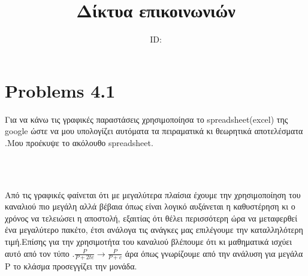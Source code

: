 \documentclass{article}
\title{Δίκτυα επικοινωνιών \\ \exerciseset}
\author{\studentname \qquad  ID: \suid}
\begin{document}
\maketitle
\section*{Problems 4.1}
Για να κάνω τις γραφικές παραστάσεις χρησιμοποίησα το spreadsheet(excel) της google ώστε να μου υπολογίζει αυτόματα τα πειραματικά κι θεωρητικά αποτελέσματα .Μου προέκυψε το ακόλουθο spreadsheet.
\begin{figure}[ht!]
	\centering
	\qquad \\
\end{figure}\\
Από τις γραφικές φαίνεται ότι με μεγαλύτερα πλαίσια έχουμε την χρησιμοποίηση του καναλιού πιο μεγάλη αλλά βέβαια όπως είναι λογικό αυξάνεται η καθυστέρηση κι  ο χρόνος να τελειώσει η αποστολή, εξαιτίας ότι θέλει περισσότερη ώρα να μεταφερθεί ένα μεγαλύτερο πακέτο, έτσι ανάλογα τις ανάγκες μας επιλέγουμε την καταλληλότερη τιμή.Επίσης για την χρησιμοτήτα του καναλιού βλέπουμε ότι κι μαθηματικά ισχύει αυτό από τον τύπο .$\frac{P}{P+2te}\rightarrow \frac{P}{P+c}$ άρα όπως γνωρίζουμε από την ανάλυση για μεγάλα P το κλάσμα προσεγγίζει την μονάδα.
\end{document}

